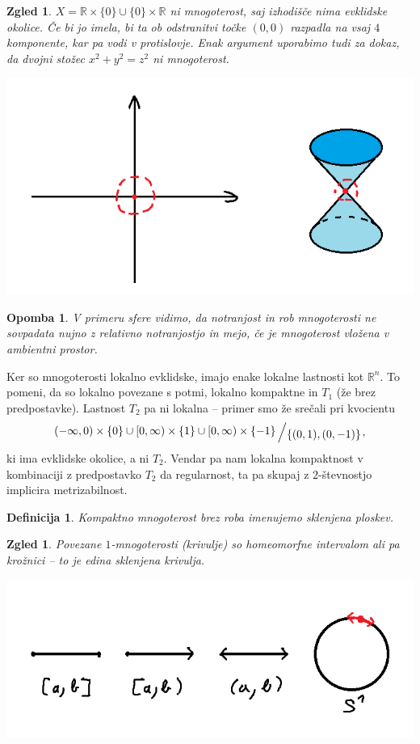 \documentclass[10pt, a4paper]{article}
\newtheorem{defi}[izr]{Definicija}
\newenvironment{noticeB}{%
  \tcolorbox[%
  notitle,
  empty,
  enhanced,  %
  breakable,
  coltext=black,
  colback=white, 
  fontupper=\rmfamily,
  parbox=false,
  noparskip,
  sharp corners,
  boxrule=-1pt,  %
  frame hidden,
  left=7pt,  %
  right=7pt,
  top=5pt,
  bottom=5pt,
  before skip=2.5ex plus 2pt,
  after skip=2.5ex plus 2pt,
  borderline west = {1.5pt}{-0.1pt}{blue!30!black}, %
  overlay unbroken and last={%
    \draw[color=black, line width=1.25pt]
    ($(frame.south west)+(1.pt, -0.1pt)$) -- ++(2em, 0);
  }
  ]}
{\endtcolorbox}
\newenvironment{definicija}{\begin{defi}\begin{noticeB}}{%
    \end{noticeB}\end{defi}}
\newtheorem*{opomba}{Opomba}
\newtheorem{zgled}[izr]{Zgled}
\newcommand{\R}{\mathbb {R}}
\newcommand{\quot}[2]{{\raisebox{0.1em}{$#1$}\left/\raisebox{-0.2em}{$#2$}\right.}}
\begin{document}
\begin{zgled}
  $X = \R \times \{0\} \cup \{0\} \times \R$ ni mnogoterost, saj izhodišče nima evklidske okolice. 
  Če bi jo imela, bi ta ob odstranitvi točke $(0, 0)$ razpadla na vsaj $4$ komponente, kar pa vodi v protislovje.
  Enak argument uporabimo tudi za dokaz, da dvojni stožec $x^2 + y^2 = z^2$ ni mnogoterost.  
  \begin{center}
    \includegraphics{zgled8.png}
  \end{center}
\end{zgled}

\begin{opomba}
  V primeru sfere vidimo, da notranjost in rob mnogoterosti ne sovpadata nujno z relativno
  notranjostjo in mejo, če je mnogoterost vložena v ambientni prostor.
\end{opomba}

Ker so mnogoterosti lokalno evklidske, imajo enake lokalne lastnosti kot $\R^n$.
To pomeni, da so lokalno povezane s potmi, lokalno kompaktne in $T_1$ (že brez predpostavke).
Lastnost $T_2$ pa ni lokalna -- primer smo že srečali pri kvocientu $$\quot{(-\infty, 0)\times \{0\} \cup [0, \infty)\times \{1\} \cup [0,\infty)\times\{-1\}}{\{(0, 1), (0, -1)\}},$$
ki ima evklidske okolice, a ni $T_2$. Vendar pa nam lokalna kompaktnost v kombinaciji 
z predpostavko $T_2$ da regularnost, ta pa skupaj z $2$-števnostjo implicira metrizabilnost.

\begin{definicija}
  Kompaktno mnogoterost brez roba imenujemo sklenjena ploskev.
\end{definicija}

\begin{zgled} 
    Povezane $1$-mnogoterosti (krivulje) so homeomorfne intervalom 
    ali pa krožnici -- to je edina sklenjena krivulja.
    \begin{center}
      \includegraphics[scale=0.6]{zgled9.png}
    \end{center}
  \end{zgled}
\end{document}
